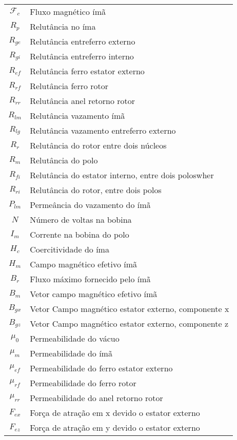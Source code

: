 \begin{longtable}{c l}
	$\mathcal{F}_c$ & Fluxo magnético ímã 				\\
	$R_{p}$			& Relutância no íma 				\\
	$R_{ge}$		& Relutância entreferro externo 	\\
	$R_{gi}$		& Relutância entreferro interno \\
	$R_{ef}$		& Relutância ferro estator externo 	\\
	$R_{rf}$		& Relutância ferro rotor 			\\
	$R_{rr}$		& Relutância anel retorno rotor 	\\
	$R_{lm}$		& Relutância vazamento ímã 			\\
	$R_{lg}$		& Relutância vazamento entreferro externo \\
	$R_{r}$			& Relutância do rotor entre dois núcleos \\
	$R_m$			& Relutância do polo \\
	$R_{fi}$		& Relutância do estator interno, entre dois poloswher\\
	$R_{ri}$		& Relutância do rotor, entre dois polos \\

	$P_{lm}$		& Permeância do vazamento do ímã	\\

	$N$				& Número de voltas na bobina \\
	$I_m$			& Corrente na bobina do polo \\	

	$H_c$			& Coercitividade do íma \\
	$H_m$			& Campo magnético efetivo ímã \\

	$B_r$ 			& Fluxo máximo fornecido pelo ímã \\
	$B_m$			& Vetor campo magnético efetivo ímã \\
	$B_{gx}$		& Vetor Campo magnético estator externo, componente x \\
	$B_{gz}$		& Vetor Campo magnético estator externo, componente z \\

	$\mu_0$			& Permeabilidade do vácuo \\
	$\mu_m$			& Permeabilidade do ímã \\
	$\mu_{ef}$		& Permeabilidade do ferro estator externo \\
	$\mu_{rf}$		& Permeabilidade do ferro rotor \\
	$\mu_{rr}$		& Permeabilidade do anel retorno rotor\\

	$F_{ex}$		& Força de atração em x devido o estator externo \\
	$F_{ez}$		& Força de atração em y devido o estator externo \\

\end{longtable} 
